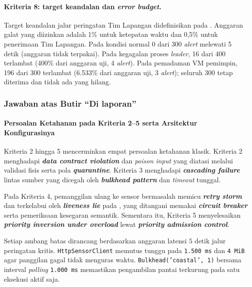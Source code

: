 \paragraph*{Kriteria 8: target keandalan dan \textit{error budget}.}
Target keandalan jalur peringatan Tim Lapangan didefinisikan pada . Anggaran galat yang diizinkan adalah 1\% untuk ketepatan waktu dan 0,5\% untuk penerimaan Tim Lapangan. Pada kondisi normal 0 dari 300 \textit{alert} melewati 5 detik (anggaran tidak terpakai). Pada kegagalan proses \textit{leader}, 16 dari 400 terlambat (400\% dari anggaran uji, 4 \textit{alert}). Pada pemadaman VM pemimpin, 196 dari 300 terlambat (6.533\% dari anggaran uji, 3 \textit{alert}); seluruh 300 tetap diterima dan tidak ada yang hilang.

\subsubsection{Jawaban atas Butir ``Di laporan''}

\paragraph*{Persoalan Ketahanan pada Kriteria 2--5 serta Arsitektur Konfigurasinya}
Kriteria 2 hingga 5 mencerminkan empat persoalan ketahanan klasik. Kriteria 2 menghadapi \textbf{\textit{data contract violation}} dan \textit{poison input} yang diatasi melalui validasi fisis serta pola \textbf{\textit{quarantine}}. Kriteria 3 menghadapi \textbf{\textit{cascading failure}} lintas sumber yang dicegah oleh \textbf{\textit{bulkhead pattern}} dan \textit{timeout} tunggal.

Pada Kriteria 4, pemanggilan ulang ke sensor bermasalah memicu \textbf{\textit{retry storm}} dan terkelabui oleh \textbf{\textit{liveness lie}} pada , yang ditangani memakai \textbf{\textit{circuit breaker}} serta pemeriksaan kesegaran semantik. Sementara itu, Kriteria 5 menyelesaikan \textbf{\textit{priority inversion under overload}} lewat \textbf{\textit{priority admission control}}.

Setiap ambang batas dirancang berdasarkan anggaran latensi $5\text{ detik}$ jalur peringatan kritis. \texttt{HttpSensorClient} memutus tunggu pada \texttt{1.500 ms} dan \texttt{4 MiB} agar panggilan gagal tidak menguras waktu. \texttt{Bulkhead('coastal', 1)} bersama interval \textit{polling} \texttt{1.000 ms} memastikan pengambilan pantai terkurung pada satu eksekusi aktif saja.

